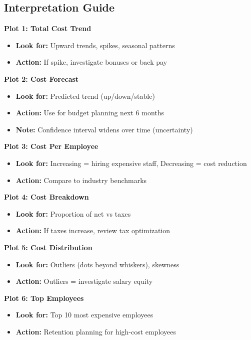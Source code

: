 \subsection{Interpretation Guide}

\textbf{Plot 1: Total Cost Trend}
\begin{itemize}
    \item \textbf{Look for:} Upward trends, spikes, seasonal patterns
    \item \textbf{Action:} If spike, investigate bonuses or back pay
\end{itemize}

\textbf{Plot 2: Cost Forecast}
\begin{itemize}
    \item \textbf{Look for:} Predicted trend (up/down/stable)
    \item \textbf{Action:} Use for budget planning next 6 months
    \item \textbf{Note:} Confidence interval widens over time (uncertainty)
\end{itemize}

\textbf{Plot 3: Cost Per Employee}
\begin{itemize}
    \item \textbf{Look for:} Increasing = hiring expensive staff, Decreasing = cost reduction
    \item \textbf{Action:} Compare to industry benchmarks
\end{itemize}

\textbf{Plot 4: Cost Breakdown}
\begin{itemize}
    \item \textbf{Look for:} Proportion of net vs taxes
    \item \textbf{Action:} If taxes increase, review tax optimization
\end{itemize}

\textbf{Plot 5: Cost Distribution}
\begin{itemize}
    \item \textbf{Look for:} Outliers (dots beyond whiskers), skewness
    \item \textbf{Action:} Outliers = investigate salary equity
\end{itemize}

\textbf{Plot 6: Top Employees}
\begin{itemize}
    \item \textbf{Look for:} Top 10 most expensive employees
    \item \textbf{Action:} Retention planning for high-cost employees
\end{itemize}

